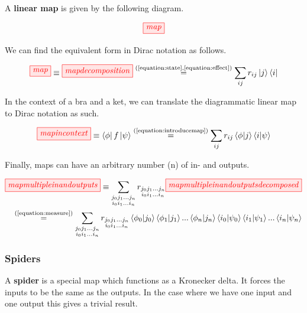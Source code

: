 \documentclass[]{article}
\newcommand{\equaltext}[1]{\ensuremath{\stackrel{\text{#1}}{=}}}
\begin{document}
A \textbf{linear map} is given by the following diagram.

\begin{equation}
\tikzfig{map}
\end{equation}

We can find the equivalent form in Dirac notation as follows.

\begin{equation}
\label{equation:introducemap}
\tikzfig{map} \equiv \tikzfig{mapdecomposition} \equaltext{(\ref{equation:state},\ref{equation:effect})} \sum_{ij}r_{ij}\ket{j}\bra{i}
\end{equation}

In the context of a bra and a ket, we can translate the diagrammatic linear map to Dirac notation as such.

\begin{equation}
\tikzfig{mapincontext} \equiv \bra{\phi}f\ket{\psi} \equaltext{(\ref{equation:introducemap})} \sum_{ij}r_{ij} \bra{\phi}\ket{j}\bra{i}\ket{\psi}
\end{equation}

Finally, maps can have an arbitrary number (n) of in- and outputs.

\begin{equation} 
\begin{aligned}
	\tikzfig{mapmultipleinandoutputs} \equiv \sum\limits_{\substack{j_0 j_1 ... j_n \\ i_0 i_1 ... i_n}} r_{\substack{j_0 j_1 ... j_n \\ i_0 i_1 ... i_n}} \tikzfig{mapmultipleinandoutputsdecomposed} \\ \equaltext{(\ref{equation:measure})} \sum\limits_{\substack{j_0 j_1 ... j_n \\ i_0 i_1 ... i_n}} r_{\substack{j_0 j_1 ... j_n \\ i_0 i_1 ... i_n}} \bra{\phi_0}\ket{j_0} \bra{\phi_1}\ket{j_1} ... \bra{\phi_n}\ket{j_n} \bra{i_0}\ket{\psi_0}\bra{i_1}\ket{\psi_1}...\bra{i_n}\ket{\psi_n}
\end{aligned}
\end{equation}

\subsubsection{Spiders}
\label{spiders}

A \textbf{spider} is a special map which functions as a Kronecker delta. It forces the inputs to be the same as the outputs. In the case where we have one input and one output this gives a trivial result.
\end{document}

